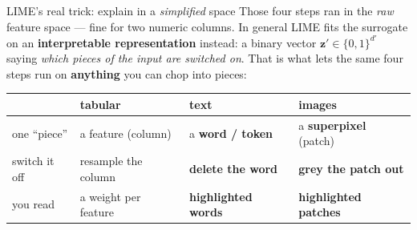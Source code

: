 \documentclass[aspectratio=169]{beamer}
\newcommand{\zv}{\mathbf{z}}
\begin{document}
\begin{frame}{LIME's real trick: explain in a \emph{simplified} space}
  Those four steps ran in the \emph{raw} feature space --- fine for two numeric columns. In
  general LIME fits the surrogate on an \textbf{interpretable representation} instead: a binary
  vector $\zv' \in \{0,1\}^{d'}$ saying \emph{which pieces of the input are switched on}.
  \vskip 4pt
  That is what lets the same four steps run on \textbf{anything} you can chop into pieces:
  \vskip 3pt
  \begin{center}\small
    \renewcommand{\arraystretch}{1.25}
    \begin{tabular}{l|l l l}
      & \textbf{tabular} & \textbf{text} & \textbf{images} \\
      \hline
      one ``piece'' & a feature (column) & a \textbf{word / token} & a \textbf{superpixel} (patch) \\
      switch it off & resample the column & \textbf{delete the word} & \textbf{grey the patch out} \\
      you read & a weight per feature & \textbf{highlighted words} & \textbf{highlighted patches} \\
    \end{tabular}
  \end{center}
  \vskip 4pt
  \begin{columns}[T]
  \end{columns}
\end{frame}
\end{document}
